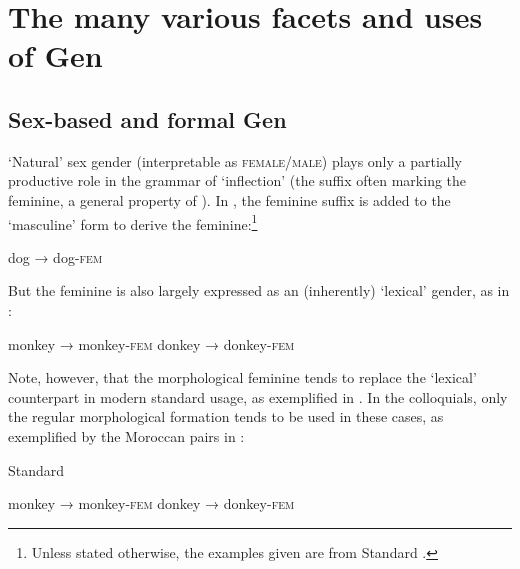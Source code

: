 \section{The many various facets and uses of Gen}\label{sec:fassi:facets}

\subsection{Sex-based and formal Gen}

`Natural' sex gender (interpretable as \textsc{female/male}) plays only a
partially productive role in the grammar of  `inflection' (the
 suffix often marking the feminine, a general property of ). In
, the feminine suffix  is added to the `masculine' form
to derive the feminine:\footnote{Unless stated otherwise, the examples given
are from Standard .}

\begin{exe}
  \ex\label{ex:fassi:1}
   dog  →  dog-\textsc{fem} 
\end{exe}

But the feminine is also largely expressed as an (inherently) `lexical' gender,
as in :

\begin{exe}
  \ex\label{ex:fassi:2}
  \begin{xlist}
    \ex\label{ex:fassi:2a}  monkey  →  monkey-\textsc{fem} 
    \ex\label{ex:fassi:2b}  donkey  →  donkey-\textsc{fem} 
  \end{xlist}
\end{exe}

Note, however, that the morphological feminine tends to replace the `lexical'
counterpart in modern standard usage, as exemplified in . In
the colloquials, only the regular morphological formation tends to be used in
these cases, as exemplified by the Moroccan  pairs in :

\begin{exe}
  \ex\label{ex:fassi:3} Standard 
  \begin{xlist}
    \ex\label{ex:fassi:3a}  monkey  →  monkey-\textsc{fem} 
    \ex\label{ex:fassi:3b}  donkey  →  donkey-\textsc{fem} 
  \end{xlist}
\end{exe}


